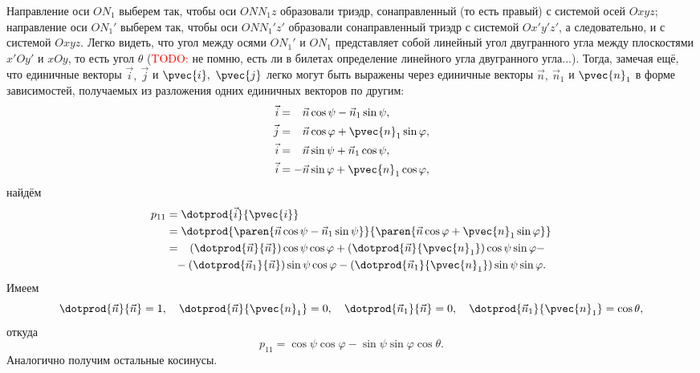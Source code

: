Направление оси $ON_1$ выберем так, чтобы оси $ONN_1 z$ образовали триэдр,
сонаправленный (то есть правый) с системой осей $Oxyz$; направление оси $ON_1'$
выберем так, чтобы оси $ONN_1' z'$ образовали сонаправленный триэдр с системой
$Ox'y'z'$, а следовательно, и с системой $Oxyz$. Легко видеть, что угол между
осями $ON_1'$ и $ON_1$ представляет собой линейный угол двугранного угла между
плоскостями $x'Oy'$ и $xOy$, то есть угол $\theta$ (\textcolor{red}{TODO:} не
помню, есть ли в билетах определение линейного угла двугранного угла...).
Тогда, замечая ещё, что единичные векторы $\vec{i},~\vec{j}$ и $\pvec{i},~
\pvec{j}$ легко могут быть выражены через единичные векторы $\vec{n},~\vec{n}_1$
и $\pvec{n}_1$ в форме зависимостей, получаемых из разложения одних единичных
векторов по другим:
\begin{equation}
  \begin{aligned}
    \vec{i} &= \phantom{-} \vec{n} \cos\psi - \vec{n}_1 \sin\psi, \\
    \vec{j} &= \phantom{-} \vec{n} \cos\varphi + \pvec{n}_1 \sin\varphi, \\
    \vec{i} &= \phantom{-} \vec{n} \sin\psi + \vec{n}_1 \cos\psi, \\
    \vec{i} &= -\vec{n} \sin\varphi + \pvec{n}_1 \cos\varphi, \\
  \end{aligned}
\end{equation}
найдём
\begin{equation*}
  \begin{aligned}
    p_{11} &= \dotprod{\vec{i}}{\pvec{i}} \\
      &= \dotprod{
        \paren{\vec{n} \cos\psi - \vec{n}_1 \sin\psi}
      }{
        \paren{\vec{n} \cos\varphi + \pvec{n}_1 \sin\varphi}
      } \\
      &= \phantom{-}
        (\dotprod{\vec{n}}{\vec{n}}) \cos\psi \cos\varphi +
        (\dotprod{\vec{n}}{\pvec{n}_1}) \cos\psi \sin\varphi - \\
      &\phantom{=} -
        (\dotprod{\vec{n}_1}{\vec{n}}) \sin\psi \cos\varphi -
        (\dotprod{\vec{n}_1}{\pvec{n}_1}) \sin\psi \sin\varphi.
  \end{aligned}
\end{equation*}
Имеем
\begin{equation*}
  \dotprod{\vec{n}}{\vec{n}} = 1, \quad
  \dotprod{\vec{n}}{\pvec{n}_1} = 0, \quad
  \dotprod{\vec{n}_1}{\vec{n}} = 0, \quad
  \dotprod{\vec{n}_1}{\pvec{n}_1} = \cos\theta,
\end{equation*}
откуда
\begin{equation*}
  p_{11} = \cos\psi \cos\varphi - \sin\psi \sin\varphi \cos\theta.
\end{equation*}
Аналогично получим остальные косинусы.

